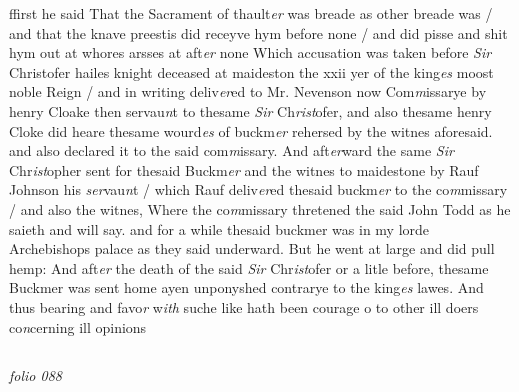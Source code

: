 \documentclass[12pt, a4paper]{book}
\begin{document}
 	
				\marginpar[\vspace{0.5cm}{\textcolor{Gray}{vi articles}}]{}
			
	
				\marginpar[\vspace{0.5cm}{\textcolor{Gray}{n}}]{}
			
	
				\marginpar[\vspace{0.5cm}{\textcolor{Gray}{n}}]{}
			
	
		\ifthenelse{\isodd{\thepage}}
		{\reversemarginpar}
		{\normalmarginpar}
		ffirst he said That the Sacrament of thault\textit{er }was
 breade as other breade was / and that the knave
 preestis did receyve hym before none / and did pisse
 and shit hym out at whores arsses at aft\textit{er} none
		Which accusation was taken before \textit{Sir} Christofer
 hailes knight deceased at maideston the xxii yer of the
 	king\textit{es} moost noble Reign / and in writing deliv\textit{er}ed to Mr.
 		Nevenson now Com\textit{m}issarye by henry Cloake then servau\textit{n}t
		to thesame \textit{Sir} Ch\textit{rist}ofer, and also thesame henry Cloke
		did heare thesame wourd\textit{es} of buckm\textit{er} rehersed by the
 witnes aforesaid. and also declared it to the said com\textit{m}issary.
		And aft\textit{er}ward the same \textit{Sir} Chr\textit{ist}opher sent for thesaid
		Buckm\textit{er} and the witnes to maidestone by Rauf Johnson
		his \textit{ser}vau\textit{n}t / which Rauf deliv\textit{er}ed thesaid buckm\textit{er} to the
		co\textit{m}missary / and also the witnes, Where the co\textit{m}missary
		thretened the said John Todd as he saieth and will say.
		and for a while thesaid buckmer was in my lorde
 Archebishops palace as they said underward. But
 he went at large and did pull hemp: And aft\textit{er} the
		death of the said \textit{Sir} Chr\textit{ist}ofer or a litle before, thesame
		Buckmer was sent home ayen unponyshed contrarye
 to the king\textit{es} lawes. And thus bearing and favo\textit{r}
 w\textit{ith} suche like hath been courage o to other ill doers
 co\textit{n}cerning ill opinions
 


            
\dotfill
						\newpage {} \subsection*{}

\textit{folio 088}


            
            	
\end{document}
